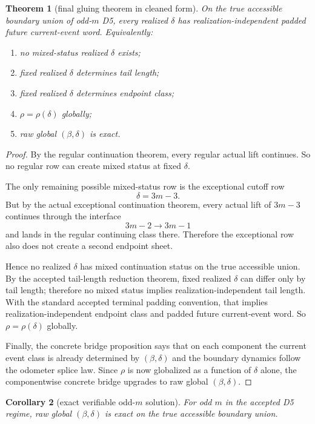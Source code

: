 \documentclass[11pt]{article}
\newtheorem{theorem}{Theorem}[section]
\newtheorem{corollary}[theorem]{Corollary}
\begin{document}
\begin{theorem}[final gluing theorem in cleaned form]
On the true accessible boundary union of odd-$m$ D5, every realized
$\delta$ has realization-independent padded future current-event word.
Equivalently:
\begin{enumerate}[label=\textup{(\arabic*)},leftmargin=2.5em]
\item no mixed-status realized $\delta$ exists;
\item fixed realized $\delta$ determines tail length;
\item fixed realized $\delta$ determines endpoint class;
\item $\rho=\rho(\delta)$ globally;
\item raw global $(\beta,\delta)$ is exact.
\end{enumerate}
\end{theorem}

\begin{proof}
By the regular continuation theorem, every regular actual lift continues. So no
regular row can create mixed status at fixed $\delta$.

The only remaining possible mixed-status row is the exceptional cutoff row
\[
\delta=3m-3.
\]
But by the actual exceptional continuation theorem, every actual lift of
$3m-3$ continues through the interface
\[
3m-2 \to 3m-1
\]
and lands in the regular continuing class there. Therefore the exceptional row
also does not create a second endpoint sheet.

Hence no realized $\delta$ has mixed continuation status on the true accessible
union. By the accepted tail-length reduction theorem, fixed realized $\delta$
can differ only by tail length; therefore no mixed status implies
realization-independent tail length. With the standard accepted terminal padding
convention, that implies realization-independent endpoint class and padded
future current-event word. So $\rho=\rho(\delta)$ globally.

Finally, the concrete bridge proposition says that on each component the current
event class is already determined by $(\beta,\delta)$ and the boundary dynamics
follow the odometer splice law. Since $\rho$ is now globalized as a function of
$\delta$ alone, the componentwise concrete bridge upgrades to raw global
$(\beta,\delta)$.
\end{proof}

\begin{corollary}[exact verifiable odd-$m$ solution]
For odd $m$ in the accepted D5 regime, raw global $(\beta,\delta)$ is exact on
the true accessible boundary union.
\end{corollary}
\end{document}
